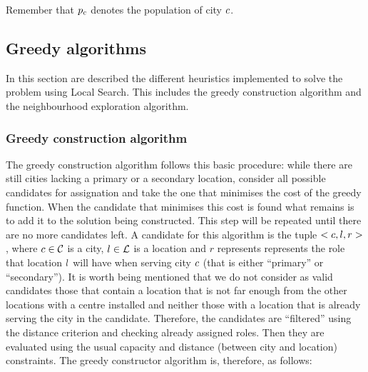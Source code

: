 Remember that $p_c$ denotes the population of city $c$.

\subsection{Greedy algorithms}
\label{sec:metaheuristics:greedy-algorithms}

In this section are described the different heuristics implemented to solve the problem using
Local Search. This includes the greedy construction algorithm and the neighbourhood
exploration algorithm.

\subsubsection{Greedy construction algorithm}
\label{sec:metaheuristics:greedy-algorithms:greedy-constructor}

The greedy construction algorithm follows this basic procedure: while there are still cities
lacking a primary or a secondary location, consider all possible candidates for assignation
and take the one that minimises the cost of the greedy function. When the candidate that
minimises this cost is found what remains is to add it to the solution being constructed.
This step will be repeated until there are no more candidates left. A candidate for this
algorithm is the tuple $<c, l, r>$, where $c \in \mathcal{C}$ is a city,
$l \in \mathcal{L}$ is a location and $r$ represents represents the role that location $l$
will have when serving city $c$ (that is either ``primary'' or ``secondary''). It is
worth being mentioned that we do not consider as valid candidates those that contain a
location that is not far enough from the other locations with a centre installed and neither
those with a location that is already serving the city in the candidate. Therefore, the
candidates are ``filtered'' using the distance criterion and checking already assigned roles.
Then they are evaluated using the usual capacity and distance (between city and location)
constraints. The greedy constructor algorithm is, therefore, as follows:

\hfill

